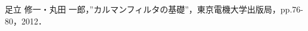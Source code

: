 \documentclass[a4paper,11pt]{jarticle}
\begin{document}




\begin{thebibliography}{99}
 足立 修一・丸田 一郎，”カルマンフィルタの基礎”，東京電機大学出版局，pp.76-80，2012．
\end{thebibliography}
\end{document}
